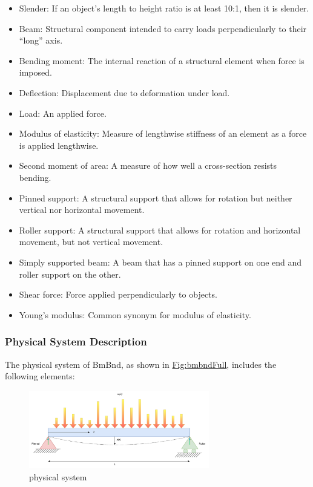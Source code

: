 \documentclass[12pt]{article}
\begin{document}
\begin{itemize}
\item{Slender: If an object's length to height ratio is at least 10:1, then it is slender.}
\item{Beam: Structural component intended to carry loads perpendicularly to their ``long'' axis.}
\item{Bending moment: The internal reaction of a structural element when force is imposed.}
\item{Deflection: Displacement due to deformation under load.}
\item{Load: An applied force.}
\item{Modulus of elasticity: Measure of lengthwise stiffness of an element as a force is applied lengthwise.}
\item{Second moment of area: A measure of how well a cross-section resists bending.}
\item{Pinned support: A structural support that allows for rotation but neither vertical nor horizontal movement.}
\item{Roller support: A structural support that allows for rotation and horizontal movement, but not vertical movement.}
\item{Simply supported beam: A beam that has a pinned support on one end and roller support on the other.}
\item{Shear force: Force applied perpendicularly to objects.}
\item{Young's modulus: Common synonym for modulus of elasticity.}
\end{itemize}
\subsubsection{Physical System Description}
\label{Sec:PhysSyst}
The physical system of BmBnd, as shown in \hyperref[Figure:bmbndFull]{Fig:bmbndFull}, includes the following elements:

\begin{figure}
\begin{center}
\includegraphics[width=0.7\textwidth]{../../../../datafiles/bmbnd/beam_bending_diagram_annotated.drawio.png}
\caption{physical system}
\label{Figure:bmbndFull}
\end{center}
\end{figure}
\end{document}
